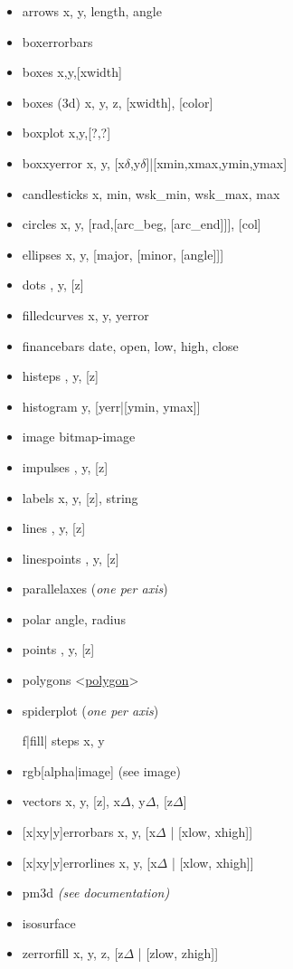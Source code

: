{\footnotesize
\begin{itemize}
    \item arrows \quad x, y, length, angle
    \item boxerrorbars \quad 
    \item boxes \quad x,y,[xwidth]
    \item boxes (3d) \quad x, y, z, [xwidth], [color]
    \item boxplot \quad x,y,[?,?]
    \item boxxyerror \quad x, y, [x$\delta$,y$\delta$]|[xmin,xmax,ymin,ymax]
    \item candlesticks \quad x, min, wsk\_min, wsk\_max, max
    \item circles \quad x, y, [rad,[arc\_beg, [arc\_end]]], [col]
    \item ellipses \quad x, y, [major, [minor, [angle]]]
    \item dots \quad [x], y, [z]
    \item filledcurves \quad x, y, yerror
    \item financebars \quad date, open, low, high, close
    \item histeps \quad [x], y, [z]
    \item histogram \quad y, [yerr|[ymin, ymax]] 
    \item image \quad bitmap-image 
    \item impulses \quad [x], y, [z] 
    \item labels \quad x, y, [z], string 
    \item lines \quad [x], y, [z]
    \item linespoints \quad [x], y, [z]
    \item parallelaxes \quad (\textit{one per axis}) 
    \item polar  \quad angle, radius 
    \item points \quad [x], y, [z]
    \item polygons \quad <\href{http://gnuplot.sourceforge.net/demo\_5.5/polygons.html}{polygon}>
    \item spiderplot \quad (\textit{one per axis}) 
    \item [f|fill|]steps \quad x, y
    \item rgb[alpha|image] \quad (see image)
    \item vectors \quad x, y, [z], x$\Delta$, y$\Delta$, [z$\Delta$] 
    \item {[x|xy|y]}errorbars \quad x, y, [x$\Delta$ | [xlow, xhigh]] 
    \item {[x|xy|y]}errorlines \quad x, y, [x$\Delta$ | [xlow, xhigh]] 
    \item pm3d \quad \textit{(see documentation)}
    \item isosurface 
    \item zerrorfill \quad x, y, z, [z$\Delta$ | [zlow, zhigh]] 
\end{itemize}}

